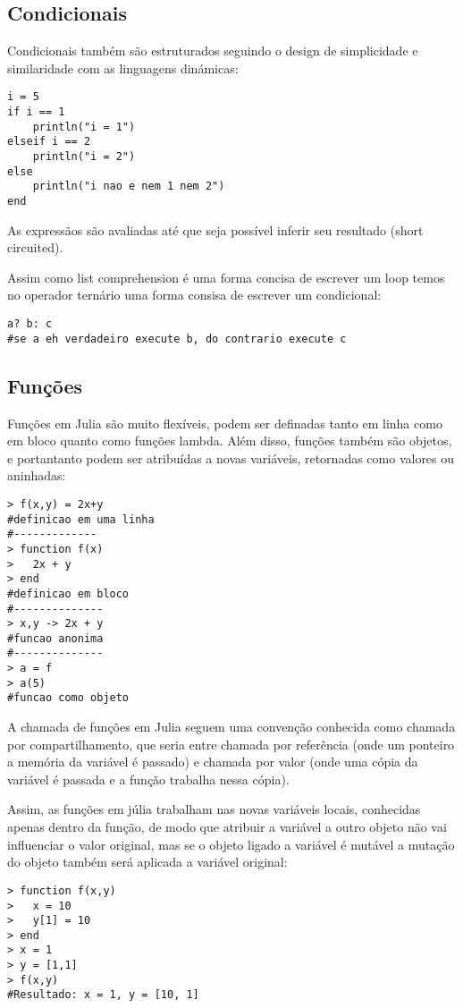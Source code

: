 \subsection{Condicionais}
Condicionais também são estruturados seguindo o design de simplicidade e similaridade com as linguagens dinámicas:
\begin{lstlisting}
i = 5
if i == 1 
	println("i = 1")
elseif i == 2
	println("i = 2")
else 
	println("i nao e nem 1 nem 2")
end
\end{lstlisting}

As expressãos são avaliadas até que seja possível inferir seu resultado (short circuited).%

Assim como list comprehension é uma forma concisa de escrever um loop temos no operador ternário uma forma consisa de escrever um condicional:
\begin{lstlisting}
a? b: c
#se a eh verdadeiro execute b, do contrario execute c
\end{lstlisting}

\subsection{Funções}
Funções em Julia são muito flexíveis, podem ser definadas tanto em linha como em bloco quanto como funções lambda. Além disso, funções também são objetos, e portantanto podem ser atribuídas a novas variáveis, retornadas como valores ou aninhadas:
\begin{lstlisting}
> f(x,y) = 2x+y
#definicao em uma linha
#-------------
> function f(x) 
> 	2x + y 
> end
#definicao em bloco
#--------------
> x,y -> 2x + y
#funcao anonima
#--------------
> a = f
> a(5)
#funcao como objeto
\end{lstlisting}

A chamada de funções em Julia seguem uma convenção conhecida como chamada por compartilhamento, que seria entre chamada por referência (onde um ponteiro a memória da variável é passado) e chamada por valor (onde uma cópia da variável é passada e a função trabalha nessa cópia).

Assim, as funções em júlia trabalham nas novas variáveis locais, conhecidas apenas dentro da função, de modo que atribuir a variável a outro objeto não vai influenciar o valor original, mas se o objeto ligado a variável é mutável a mutação do objeto também será aplicada a variável original:
\begin{lstlisting}
> function f(x,y) 
> 	x = 10
> 	y[1] = 10
> end
> x = 1
> y = [1,1]
> f(x,y)
#Resultado: x = 1, y = [10, 1]

\end{lstlisting}

